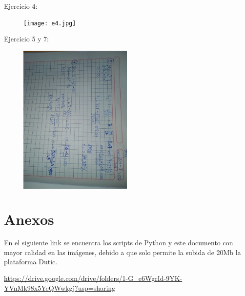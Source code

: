 \documentclass[a4paper,12pt]{article}
\begin{document}
    Ejercicio 4:
    \begin{figure}[h]
        \centering
        \texttt{[image: e4.jpg]}
    \end{figure}
    \newpage
    Ejercicio 5 y 7:
    \begin{figure}[h]
        \centering
        \includegraphics[width=0.5\textwidth,angle=90]{e5_7.jpg}
    \end{figure}
    \section{Anexos}
    En el siguiente link se encuentra los scripts de Python
    y este documento con mayor calidad en las imágenes, 
    debido a que solo permite la subida de 20Mb la plataforma Dutic.
    
    {\small \url{https://drive.google.com/drive/folders/1-G_e6WgrId-9YK-YVnMk98x5YeQWwkgj?usp=sharing}}
\end{document}
